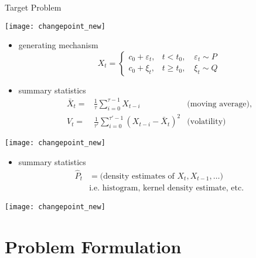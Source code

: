 \documentclass[fleqn,aspectratio=1610]{beamer}
\begin{document}
\begin{frame}[label={sec:org2c4ad5c},t]{Target Problem}
\begin{center}
\texttt{[image: changepoint\_new]}
\end{center}
\begin{overprint}
\begin{itemize}
\item generating mechanism
\begin{equation}
  X_{t}=
  \begin{cases}
    c_{0}+\varepsilon_{t},&t<t_{0}, \quad\varepsilon_{t}\sim P\\
    c_{0}+\xi_{t},&t\geq t_{0}, \quad\xi_{t}\sim Q
  \end{cases}
\end{equation}
\end{itemize}
\begin{itemize}
\item summary statistics
\begin{align}
  \bar{X}_{t}=&\frac{1}{\tau}\sum_{i=0}^{\tau-1}X_{t-i}
  &\text{(moving average)},\\
  V_{t}=&\frac{1}{\tau'}\sum_{i=0}^{\tau'-1}(X_{t-i}-\bar{X}_{t})^{2}
               &\text{(volatility)}
\end{align}
\end{itemize}
\begin{center}
\texttt{[image: changepoint\_new]}
\end{center}
\begin{itemize}
\item summary statistics
\begin{align}
  \hat{P}_{t}
  &=\text{(density estimates of \(X_{t},X_{t-1},\dotsc\))}\\
  &\text{i.e. histogram, kernel density estimate, etc.}
\end{align}
\end{itemize}
\begin{center}
\texttt{[image: changepoint\_new]}
\end{center}
\end{overprint}
\end{frame}


\section{Problem Formulation}
\label{sec:org9fa4e0a}
\end{document}
